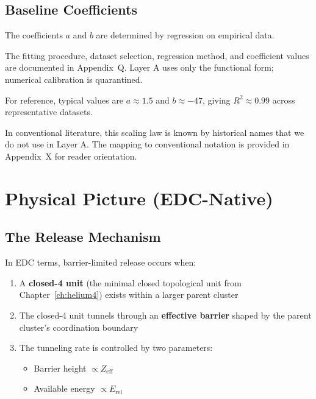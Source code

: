 \subsection{Baseline Coefficients}

The coefficients $a$ and $b$ are determined by regression on empirical data.

\begin{quarantinebox}[title=Appendix Q: Coefficient Estimation]
    The fitting procedure, dataset selection, regression method, and
    coefficient values are documented in Appendix~Q. Layer A uses only
    the functional form; numerical calibration is quarantined.
\end{quarantinebox}

For reference, typical values are $a \approx 1.5$ and $b \approx -47$,
giving $R^2 \approx 0.99$ across representative datasets. \tagBL

\begin{quarantinebox}[title=Appendix X: Conventional Notation]
    In conventional literature, this scaling law is known by historical
    names that we do not use in Layer A. The mapping to conventional
    notation is provided in Appendix~X for reader orientation.
\end{quarantinebox}

\section{Physical Picture (EDC-Native)}
\label{sec:gn:picture}

\subsection{The Release Mechanism}

In EDC terms, barrier-limited release occurs when:

\begin{enumerate}
    \item A \textbf{closed-4 unit} (the minimal closed topological unit from
          Chapter~\ref{ch:helium4}) exists within a larger parent cluster
    \item The closed-4 unit tunnels through an \textbf{effective barrier}
          shaped by the parent cluster's coordination boundary
    \item The tunneling rate is controlled by two parameters:
          \begin{itemize}
              \item Barrier height $\propto Z_{\text{eff}}$
              \item Available energy $\propto E_{\text{rel}}$
          \end{itemize}
\end{enumerate}

